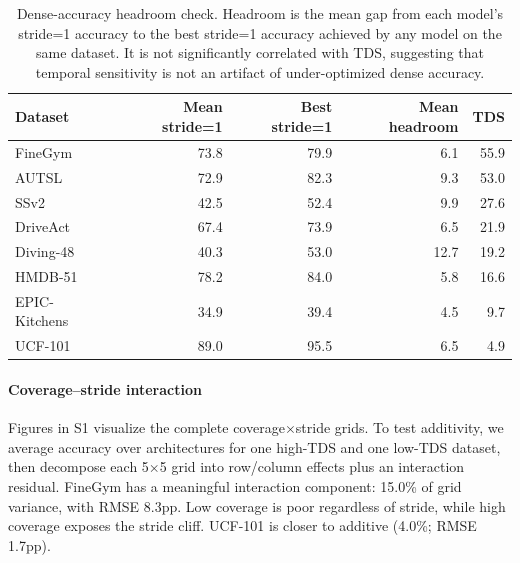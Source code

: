 \documentclass[a4paper, 10pt, conference, onecolumn]{ieeeconf}
\newcommand{\tabtight}{\setlength{\tabcolsep}{3.5pt}\renewcommand{\arraystretch}{1.12}}
\newcommand{\TDS}{\textsc{TDS}}
\begin{document}
\begin{table}[!htbp]
\centering
\caption{Dense-accuracy headroom check. Headroom is the mean gap from each model's stride=1 accuracy to the best stride=1 accuracy achieved by any model on the same dataset. It is not significantly correlated with \TDS{}, suggesting that temporal sensitivity is not an artifact of under-optimized dense accuracy.}
\label{tab:headroom_check}
\scriptsize\tabtight
\begin{tabular}{l r r r r}
\toprule
Dataset & Mean stride=1 & Best stride=1 & Mean headroom & \TDS{} \\
\midrule
FineGym       & 73.8 & 79.9 &  6.1 & 55.9 \\
AUTSL         & 72.9 & 82.3 &  9.3 & 53.0 \\
SSv2          & 42.5 & 52.4 &  9.9 & 27.6 \\
DriveAct      & 67.4 & 73.9 &  6.5 & 21.9 \\
Diving-48     & 40.3 & 53.0 & 12.7 & 19.2 \\
HMDB-51       & 78.2 & 84.0 &  5.8 & 16.6 \\
EPIC-Kitchens & 34.9 & 39.4 &  4.5 &  9.7 \\
UCF-101       & 89.0 & 95.5 &  6.5 &  4.9 \\
\bottomrule
\end{tabular}
\end{table}

\paragraph{Coverage--stride interaction}
Figures in S1 visualize the complete coverage$\times$stride grids. To test additivity, we average accuracy over architectures for one high-\TDS{} and one low-\TDS{} dataset, then decompose each 5$\times$5 grid into row/column effects plus an interaction residual. FineGym has a meaningful interaction component: 15.0\% of grid variance, with RMSE 8.3pp. Low coverage is poor regardless of stride, while high coverage exposes the stride cliff. UCF-101 is closer to additive (4.0\%; RMSE 1.7pp).
\end{document}
